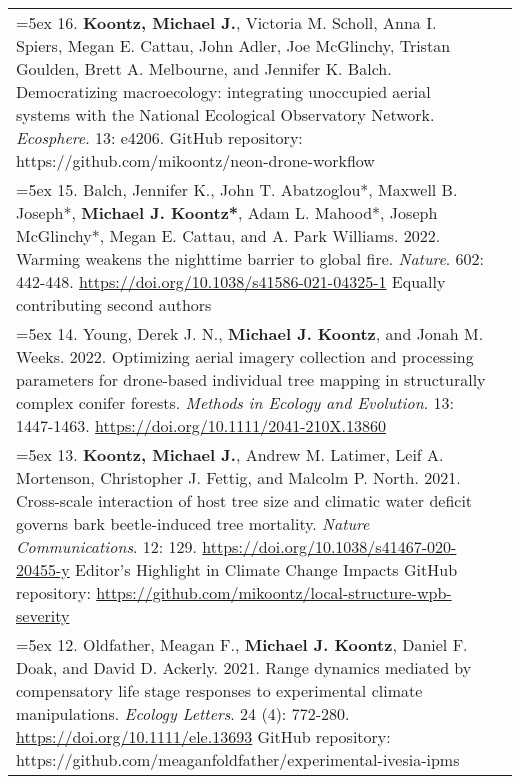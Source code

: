 \begin{longtable}{@{} >{\raggedright}p{6.10in} >{\raggedleft}X @{}}

\hangindent=5ex 16. \textbf{Koontz, Michael J.}, Victoria M. Scholl, Anna I. Spiers, Megan E. Cattau, John Adler, Joe McGlinchy, Tristan Goulden, Brett A. Melbourne, and Jennifer K. Balch. Democratizing macroecology: integrating unoccupied aerial systems with the National Ecological Observatory Network. \emph{Ecosphere}. 13: e4206.
\newline GitHub repository: https://github.com/mikoontz/neon-drone-workflow & \tabularnewline

\hangindent=5ex 15. Balch, Jennifer K., John T. Abatzoglou*, Maxwell B. Joseph*, \textbf{Michael J. Koontz*}, Adam L. Mahood*, Joseph McGlinchy*, Megan E. Cattau, and A. Park Williams. 2022. Warming weakens the nighttime barrier to global fire. \emph{Nature}. 602: 442-448. \href{https://doi.org/10.1038/s41586-021-04325-1}{https://doi.org/10.1038/s41586-021-04325-1}
\newline *Equally contributing second authors & \tabularnewline

\hangindent=5ex 14. Young, Derek J. N., \textbf{Michael J. Koontz}, and Jonah M. Weeks. 2022. Optimizing aerial imagery collection and processing parameters for drone-based individual tree mapping in structurally complex conifer forests. \emph{Methods in Ecology and Evolution}. 13: 1447-1463. \href{https://doi.org/10.1111/2041-210X.13860}{https://doi.org/10.1111/2041-210X.13860} & \tabularnewline

\hangindent=5ex 13. \textbf{Koontz, Michael J.}, Andrew M. Latimer, Leif A. Mortenson, Christopher J. Fettig, and Malcolm P. North. 2021. Cross-scale interaction of host tree size and climatic water deficit governs bark beetle-induced tree mortality. \emph{Nature Communications}. 12: 129. \href{https://doi.org/10.1038/s41467-020-20455-y}{https://doi.org/10.1038/s41467-020-20455-y}
\newline *Editor's Highlight in Climate Change Impacts %
\newline GitHub repository: \href{https://github.com/mikoontz/local-structure-wpb-severity}{https://github.com/mikoontz/local-structure-wpb-severity} & \tabularnewline

\hangindent=5ex 12. Oldfather, Meagan F., \textbf{Michael J. Koontz}, Daniel F. Doak, and David D. Ackerly. 2021. Range dynamics mediated by compensatory life stage responses to experimental climate manipulations. \emph{Ecology Letters}. 24 (4): 772-280. \href{https://doi.org/10.1111/ele.13693}{https://doi.org/10.1111/ele.13693}
\newline GitHub repository: https://github.com/meaganfoldfather/experimental-ivesia-ipms & \tabularnewline


\end{longtable}
